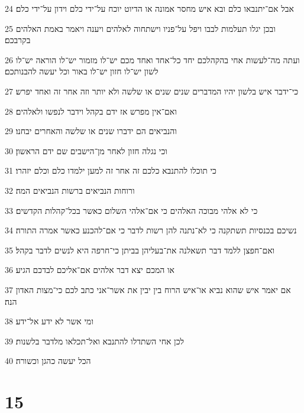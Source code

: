 \par 24 אבל אם־יתנבאו כלם ובא איש מחסר אמונה או הדיוט יוכח על־ידי כלם וידון על־ידי כלם׃
\par 25 ובכן יגלו תעלמות לבבו ויפל על־פניו וישתחוה לאלהים ויענה ויאמר באמת האלהים בקרבכם׃
\par 26 ועתה מה־לעשות אחי בהקהלכם יחד כל־אחד ואחד מכם יש־לו מזמור יש־לו הוראה יש־לו לשון יש־לו חזון יש־לו באור וכל יעשה להבנותכם׃
\par 27 כי־ידבר איש בלשון יהיו המדברים שנים שנים או שלשה ולא יותר וזה אחר זה ואחד יפרש׃
\par 28 ואם־אין מפרש אז ידם בקהל וידבר לנפשו ולאלהים׃
\par 29 והנביאים הם ידברו שנים או שלשה והאחרים יבחנו׃
\par 30 וכי נגלה חזון לאחר מן־הישבים שם ידם הראשון׃
\par 31 כי תוכלו להתנבא כלכם זה אחר זה למען ילמדו כלם וכלם יזהרו׃
\par 32 ורוחות הנביאים ברשות הנביאים המה׃
\par 33 כי לא אלהי מבוכה האלהים כי אם־אלהי השלום כאשר בכל־קהלות הקדשים׃
\par 34 נשיכם בכנסיות תשתקנה כי לא־נתנה להן רשות לדבר כי אם־להכנע כאשר אמרה התורה׃
\par 35 ואם־חפצן ללמד דבר תשאלנה את־בעליהן בביתן כי־חרפה היא לנשים לדבר בקהל׃
\par 36 או המכם יצא דבר אלהים אם־אליכם לבדכם הגיע׃
\par 37 אם יאמר איש שהוא נביא או־איש הרוח בין יבין את אשר־אני כתב לכם כי־מצות האדון הנה׃
\par 38 ומי אשר לא ידע אל־ידע׃
\par 39 לכן אחי השתדלו להתנבא ואל־תכלאו מלדבר בלשנות׃
\par 40 הכל יעשה כהגן וכשורה׃

\chapter{15}

